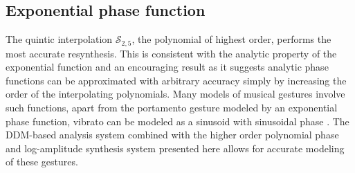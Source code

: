 \subsection{Exponential phase function}

The quintic interpolation $\mathscr{S}_{2,5}$, the polynomial of highest order,
performs the most accurate resynthesis. This is consistent with the analytic
property of the exponential function and an encouraging result as it suggests
analytic phase functions can be approximated with arbitrary accuracy simply by
increasing the order of the interpolating polynomials. Many models of musical
gestures involve such functions, apart from the portamento gesture modeled by an
exponential phase function, vibrato can be modeled as a sinusoid with sinusoidal
phase \cite{maher1990investigation}. The DDM-based analysis system combined with
the higher order polynomial phase and log-amplitude synthesis system presented here
allows for accurate modeling of these gestures.
